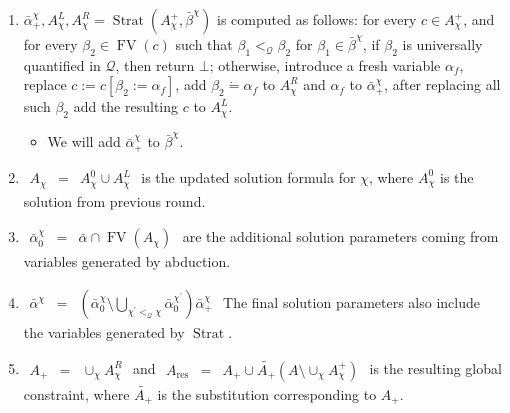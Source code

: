 \documentclass{article}
\newcommand{\assign}{:=}
\newcommand{\tmop}[1]{\ensuremath{\operatorname{#1}}}
\begin{document}
\begin{enumerate}
  \item $\bar{\alpha}_+^{\chi}, A_{\chi}^L, A^R_{\chi} = \tmop{Strat}
  (A^+_{\chi}, \bar{\beta}^{\chi})$ is computed as follows: for every $c \in
  A^+_{\chi}$, and for every $\beta_2 \in \tmop{FV} (c)$ such that $\beta_1
  <_{\mathcal{Q}} \beta_2$ for $\beta_1 \in \bar{\beta}^{\chi}$, if $\beta_2$
  is universally quantified in $\mathcal{Q}$, then return $\bot$; otherwise,
  introduce a fresh variable $\alpha_f$, replace $c \assign c [\beta_2 \assign
  \alpha_f]$, add $\beta_2 \dot{=} \alpha_f$ to $A^R_{\chi}$ and $\alpha_f$ to
  $\bar{\alpha}_+^{\chi}$, after replacing all such $\beta_2$ add the
  resulting $c$ to $A_{\chi}^L$.
  \begin{itemize}
    \item We will add $\bar{\alpha}_+^{\chi}$ to $\bar{\beta}^{\chi}$.
  \end{itemize}
  \item $\begin{array}{lll}
    A_{\chi} & = & A_{\chi}^0 \cup A_{\chi}^L
  \end{array}$ is the updated solution formula for $\chi$, where $A_{\chi}^0$
  is the solution from previous round.
  
  \item $\begin{array}{lll}
    \bar{\alpha}^{\chi}_0 & = & \bar{\alpha} \cap \tmop{FV} (A_{\chi})
  \end{array}$ are the additional solution parameters coming from variables
  generated by abduction.
  
  \item $\begin{array}{lll}
    \bar{\alpha}^{\chi} & = & \left( \bar{\alpha}^{\chi}_0 \setminus
    \bigcup_{\chi^{\prime} <_{\mathcal{Q}} \chi}
    \bar{\alpha}^{\chi^{\prime}}_0 \right) \bar{\alpha}_+^{\chi}
  \end{array}$ The final solution parameters also include the variables
  generated by $\tmop{Strat}$.
  
  \item $\begin{array}{lll}
    A_+ & = & \cup_{\chi} A_{\chi}^R
  \end{array}$ and $\begin{array}{lll}
    A_{\tmop{res}} & = & A_+ \cup \widetilde{A_+} (A \setminus \cup_{\chi}
    A_{\chi}^+)
  \end{array}$ is the resulting global constraint, where $\widetilde{A_+}$ is
  the substitution corresponding to $A_+$.
  

\end{enumerate}
\end{document}
